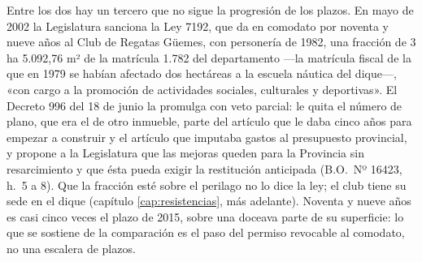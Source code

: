 Entre los dos hay un tercero que no sigue la progresión de los plazos. En mayo de 2002 la Legislatura sanciona la Ley 7192, que da en comodato por noventa y nueve años al Club de Regatas Güemes, con personería de 1982, una fracción de 3 ha 5.092,76 m² de la matrícula 1.782 del departamento ---la matrícula fiscal de la que en 1979 se habían afectado dos hectáreas a la escuela náutica del dique---, «con cargo a la promoción de actividades sociales, culturales y deportivas». El Decreto 996 del 18 de junio la promulga con veto parcial: le quita el número de plano, que era el de otro inmueble, parte del artículo que le daba cinco años para empezar a construir y el artículo que imputaba gastos al presupuesto provincial, y propone a la Legislatura que las mejoras queden para la Provincia sin resarcimiento y que ésta pueda exigir la restitución anticipada (B.O.\ Nº 16423, h.\ 5 a 8). Que la fracción esté sobre el perilago no lo dice la ley; el club tiene su sede en el dique (capítulo \ref{cap:resistencias}, más adelante). Noventa y nueve años es casi cinco veces el plazo de 2015, sobre una doceava parte de su superficie: lo que se sostiene de la comparación es el paso del permiso revocable al comodato, no una escalera de plazos.

